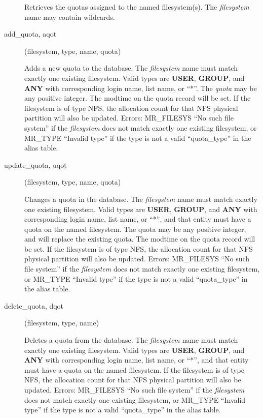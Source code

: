 \documentclass{article}
\begin{document}
\begin{description}
Retrieves the quotas assigned to the named filesystem(s).  The
{\em filesystem} name may contain wildcards.

\item[add\_quota, aqot](filesystem, type, name, quota)

Adds a new quota to the database.  The {\em filesystem} name must match
exactly one existing filesystem.  Valid types are {\bf USER}, {\bf GROUP},
and {\bf ANY} with corresponding login name, list name, or ``*''.  The
{\em quota} may be any positive integer.  The modtime on the quota
record will be set.  If the filesystem is of type NFS, the allocation
count for that NFS physical partition will also be updated.  Errors:
MR\_FILESYS ``No such file system'' if the {\em filesystem} does not match
exactly one existing filesystem, or MR\_TYPE ``Invalid type'' if the type
is not a valid ``quota\_type'' in the alias table.

\item[update\_quota, uqot](filesystem, type, name, quota)

Changes a quota in the database.  The {\em filesystem} name must match
exactly one existing filesystem.  Valid types are {\bf USER}, {\bf GROUP},
and {\bf ANY} with corresponding login name, list name, or ``*'', and that
entity must have a quota on the named filesystem.  The quota may be
any positive integer, and will replace the existing quota.  The
modtime on the quota record will be set.  If the filesystem is of type
NFS, the allocation count for that NFS physical partition will also be
updated.  Errors: MR\_FILESYS ``No such file system'' if the
{\em filesystem} does not match exactly one existing filesystem, or
MR\_TYPE ``Invalid type'' if the type is not a valid ``quota\_type'' in the
alias table.

\item[delete\_quota, dqot](filesystem, type, name)

Deletes a quota from the database.  The {\em filesystem} name must match
exactly one existing filesystem.  Valid types are {\bf USER}, {\bf GROUP},
and {\bf ANY} with corresponding login name, list name, or ``*'', and that
entity must have a quota on the named filesystem.  If the filesystem
is of type NFS, the allocation count for that NFS physical partition
will also be updated.  Errors: MR\_FILESYS ``No such file system'' if the
{\em filesystem} does not match exactly one existing filesystem, or
MR\_TYPE ``Invalid type'' if the type is not a valid ``quota\_type'' in the
alias table.


\end{description}
\end{document}
